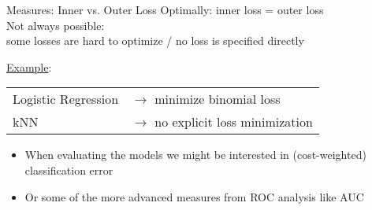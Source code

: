 \begin{vbframe}{Measures: Inner vs. Outer Loss}
\lz
Optimally: inner loss = outer loss\\[.5em]
Not always possible:\\ some losses are hard to optimize / no loss is specified directly\\

\lz

\underline{Example}:\\[.5em]
\begin{tabular}{ll}
Logistic Regression & $\rightarrow$ minimize binomial loss \\
kNN & $\rightarrow$ no explicit loss minimization\\
\end{tabular}
\begin{itemize}
  \item When evaluating the models we might be interested in (cost-weighted) classification error 
  \item Or some of the more advanced measures from ROC analysis like AUC
\end{itemize}


\end{vbframe}

\endlecture


